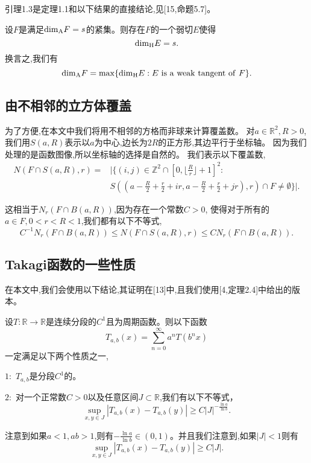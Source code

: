 引理1.3是定理1.1和以下结果的直接结论,见[15,命题5.7]。

\begin{theorem}[KOR]
      设$F$是满足$\mathrm{\dim_A} F=s$的紧集。则存在$F$的一个弱切$E$使得
      $$
      \mathrm{\dim_H} E=s.
      $$
      换言之,我们有
      $$
      \mathrm{\dim_A} F=\max\{\mathrm{\dim_H} E:E~\mathrm{is~a~weak~tangent~of}~F \}.
      $$
\end{theorem}
\subsection{由不相邻的立方体覆盖}
为了方便,在本文中我们将用不相邻的方格而非球来计算覆盖数。
对$a\in\mathbb{R}^2,R>0$,我们用$S(a,R)$表示以$a$为中心,边长为$2R$的正方形,其边平行于坐标轴。
因为我们处理的是函数图像,所以坐标轴的选择是自然的。
我们表示以下覆盖数,
$$
\begin{aligned}
      N(F\cap S(a,R),r)=&|\{(i,j)\in\mathbb{Z}^2\cap[0,\lfloor\frac{R}{r}\rfloor+1]^2:\\
      &S((a-\frac{R}{2}+\frac{r}{2}+ir,a-\frac{R}{2}+\frac{r}{2}+jr),r)\cap F\neq\emptyset\}|.
\end{aligned}
$$

这相当于$N_r(F\cap B(a,R))$,因为存在一个常数$C>0$,
使得对于所有的$a\in F,0<r<R<1$,我们都有以下不等式,
$$
C^{-1}N_r(F\cap B(a,R))\le N(F\cap S(a,R),r) \le CN_r(F\cap B(a,R)).
$$

\subsection{Takagi函数的一些性质}
在本文中,我们会使用以下结论,其证明在[13]中,且我们使用[4,定理2.4]中给出的版本。

\begin{lemma}
      设$T:\mathbb{R}\rightarrow\mathbb{R}$是连续分段的$C^1$且为周期函数。则以下函数
      $$
      T_{a,b}(x)=\sum_{n=0}^\infty a^nT(b^nx)
      $$
      一定满足以下两个性质之一,

      $1:$ $T_{a,b}$是分段$C^1$的。

      $2:$ 对一个正常数$C>0$以及任意区间$J\subset\mathbb{R}$,我们有以下不等式，
      $$
      \underset{x,y\in J}{\sup}|T_{a,b}(x)-T_{a,b}(y)|\ge C|J|^{-\frac{\ln a}{\ln b}}.
      $$

\end{lemma}

注意到如果$a<1,ab>1$,则有$-\frac{\ln a}{\ln b}\in(0,1)$。并且我们注意到,如果$|J|<1$则有
$$
\underset{x,y\in J}{\sup}|T_{a,b}(x)-T_{a,b}(y)|\ge C|J|.
$$

